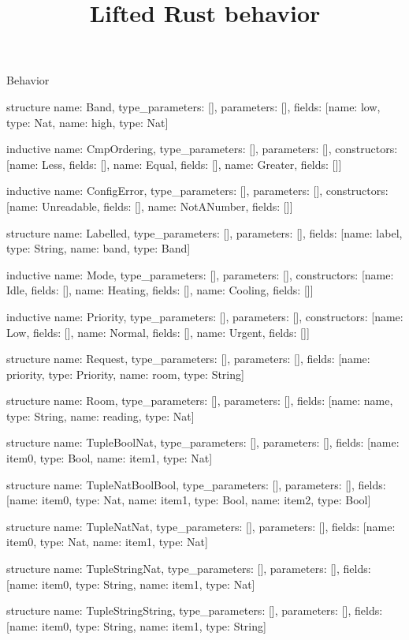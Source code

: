 \begin{lexlean}{Behavior}
\title{Lifted Rust behavior}
\begin{semanticmodule}
structure{
  name: Band,
  type_parameters: [],
  parameters: [],
  fields: [{name: low, type: Nat}, {name: high, type: Nat}]
}

inductive{
  name: CmpOrdering,
  type_parameters: [],
  parameters: [],
  constructors: [{name: Less, fields: []}, {name: Equal, fields: []}, {name: Greater, fields: []}]
}

inductive{
  name: ConfigError,
  type_parameters: [],
  parameters: [],
  constructors: [{name: Unreadable, fields: []}, {name: NotANumber, fields: []}]
}

structure{
  name: Labelled,
  type_parameters: [],
  parameters: [],
  fields: [{name: label, type: String}, {name: band, type: Band}]
}

inductive{
  name: Mode,
  type_parameters: [],
  parameters: [],
  constructors: [{name: Idle, fields: []}, {name: Heating, fields: []}, {name: Cooling, fields: []}]
}

inductive{
  name: Priority,
  type_parameters: [],
  parameters: [],
  constructors: [{name: Low, fields: []}, {name: Normal, fields: []}, {name: Urgent, fields: []}]
}

structure{
  name: Request,
  type_parameters: [],
  parameters: [],
  fields: [{name: priority, type: Priority}, {name: room, type: String}]
}

structure{
  name: Room,
  type_parameters: [],
  parameters: [],
  fields: [{name: name, type: String}, {name: reading, type: Nat}]
}

structure{
  name: TupleBoolNat,
  type_parameters: [],
  parameters: [],
  fields: [{name: item0, type: Bool}, {name: item1, type: Nat}]
}

structure{
  name: TupleNatBoolBool,
  type_parameters: [],
  parameters: [],
  fields: [{name: item0, type: Nat}, {name: item1, type: Bool}, {name: item2, type: Bool}]
}

structure{
  name: TupleNatNat,
  type_parameters: [],
  parameters: [],
  fields: [{name: item0, type: Nat}, {name: item1, type: Nat}]
}

structure{
  name: TupleStringNat,
  type_parameters: [],
  parameters: [],
  fields: [{name: item0, type: String}, {name: item1, type: Nat}]
}

structure{
  name: TupleStringString,
  type_parameters: [],
  parameters: [],
  fields: [{name: item0, type: String}, {name: item1, type: String}]
}


\end{semanticmodule}
\end{lexlean}

